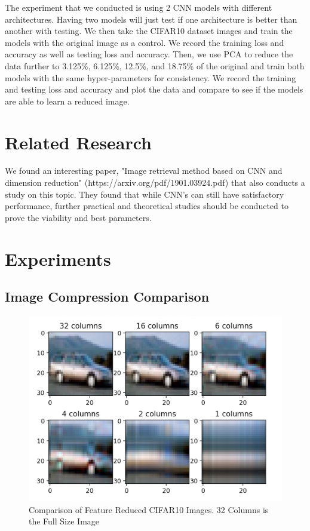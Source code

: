 \documentclass{article}
\begin{document}
The experiment that we conducted is using 2 CNN models with different architectures. Having two models will just test if one architecture is better than another with testing. We then take the CIFAR10 dataset images and train the models with the original image as a control. We record the training loss and accuracy as well as testing loss and accuracy. Then, we use PCA to reduce the data further to 3.125\%, 6.125\%, 12.5\%, and 18.75\% of the original and train both models with the same hyper-parameters for consistency. We record the training and testing loss and accuracy and plot the data and compare to see if the models are able to learn a reduced image. 

\section{Related Research}

We found an interesting paper, "Image retrieval method based on CNN and
dimension reduction" (https://arxiv.org/pdf/1901.03924.pdf) that also conducts a study on this topic. They found that while CNN's can still have satisfactory performance, further practical and theoretical studies should be conducted to prove the viability and best parameters. 


\section{Experiments}
\subsection{Image Compression Comparison}
\begin{figure}[!htb]
	\includegraphics[width=\linewidth]{figures/compressed_imgs.png}
	\caption{Comparison of Feature Reduced CIFAR10 Images. 32 Columns is the Full Size Image}
\end{figure}
\end{document}
